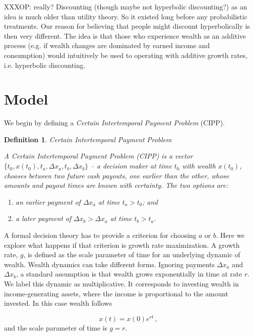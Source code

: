 \documentclass[11pt]{article}
\newtheorem{definition}{Definition}
\newcommand{\be}{\begin{equation}}
\newcommand{\ee}{\end{equation}}
\newcommand{\Dx}{\Delta x}
\numberwithin{equation}{section}
\begin{document}
XXXOP: really? Discounting (though maybe not hyperbolic discounting?) as an idea is much older than utility theory. So it existed long before any probabilistic treatments. Our reason for believing that people might discount hyperbolically is then very different. The idea is that those who experience wealth as an additive process (e.g. if wealth changes are dominated by earned income and consumption) would intuitively be used to operating with additive growth rates, i.e. hyperbolic discounting.

\section{Model}\label{sec:model}

We begin by defining a \textit{Certain Intertemporal Payment Problem} (CIPP).

\begin{definition}{Certain Intertemporal Payment Problem}

A Certain Intertemporal Payment Problem (CIPP) is a vector $\{t_0,x\left(t_0\right),t_a,\Dx_a,t_b,\Dx_b\}$ -- a decision maker at time $t_0$ with wealth $x\left(t_0\right)$, chooses between two future cash payouts, one earlier than the other, whose amounts and payout times are known with certainty. The two options are:

\begin{enumerate}
\item[$a$.] an earlier payment of $\Dx_a$ at time $t_a>t_0$; and
\item[$b$.] a later payment of $\Dx_b>\Dx_a$ at time $t_b>t_a$.
\end{enumerate}

\end{definition}

A formal decision theory has to provide a criterion for choosing $a$ or $b$. Here we explore what happens if that criterion is growth rate maximization. A growth rate, $g$, is defined as the scale parameter of time for an underlying dynamic of wealth. Wealth dynamics can take different forms. Ignoring payments $\Dx_a$ and $\Dx_b$, a standard assumption is that wealth grows exponentially in time at rate $r$. We label this dynamic as multiplicative. It corresponds to investing wealth in income-generating assets, where the income is proportional to the amount invested. In this case wealth follows

\be
x\left(t\right) = x\left(0\right) e^{r t}\,,
\ee
and the scale parameter of time is $g=r$.
\end{document}
